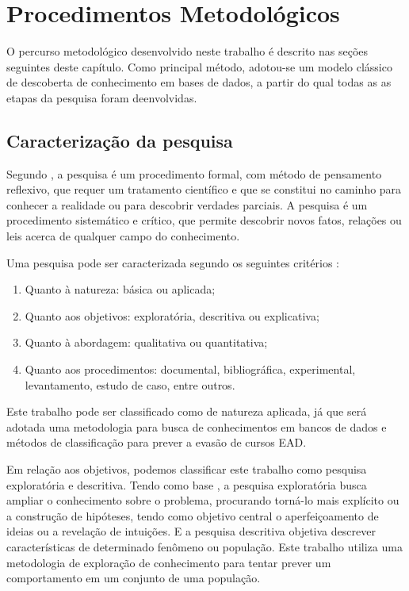 \chapter{Procedimentos Metodológicos} \label{metodos}

O percurso metodológico desenvolvido neste trabalho é descrito nas seções
seguintes deste capítulo. Como principal método, adotou-se um modelo clássico de
descoberta de conhecimento em bases de dados, a partir do qual todas as as
etapas da pesquisa foram deenvolvidas.

\section{Caracterização da pesquisa}

Segundo , a pesquisa é um procedimento
formal, com método de pensamento reflexivo, que requer um tratamento científico
e que se constitui no caminho para conhecer a realidade ou para descobrir
verdades parciais. A pesquisa é um procedimento sistemático e crítico,  que
permite descobrir novos fatos, relações ou leis acerca de qualquer campo do
conhecimento.

Uma pesquisa pode ser caracterizada segundo os seguintes critérios
\cite{gil2008metodos}:
\begin{enumerate}[label=\alph*)]
  \item Quanto à natureza: básica ou aplicada;
  \item Quanto aos objetivos: exploratória, descritiva ou explicativa;
  \item Quanto à abordagem: qualitativa ou quantitativa;
  \item Quanto aos procedimentos: documental, bibliográfica, experimental,
  levantamento, estudo de caso, entre outros.
\end{enumerate}

Este trabalho pode ser classificado como de natureza aplicada, já que será
adotada uma metodologia para busca de conhecimentos em bancos de dados e métodos
de classificação para prever a evasão de cursos EAD.

Em relação aos objetivos, podemos classificar este trabalho como pesquisa
exploratória e descritiva. Tendo como base , a
pesquisa exploratória busca ampliar o conhecimento sobre o problema, procurando
torná-lo mais explícito ou a construção de hipóteses, tendo como objetivo
central o aperfeiçoamento de ideias ou a revelação de intuições. E a pesquisa
descritiva objetiva descrever características de determinado fenômeno ou
população. Este trabalho utiliza uma metodologia de exploração de conhecimento
para tentar prever um comportamento em um conjunto de uma população.


